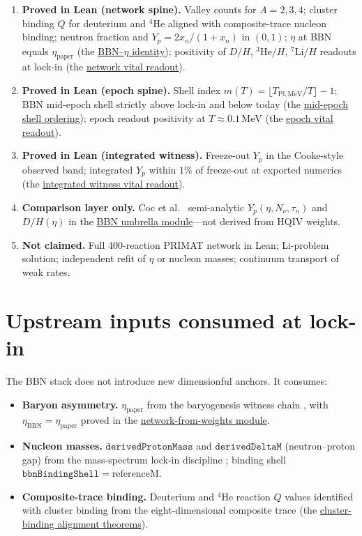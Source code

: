 \documentclass[11pt]{amsart}
\begin{document}
\begin{enumerate}[leftmargin=2em]
\item \textbf{Proved in Lean (network spine).}
  Valley counts for $A=2,3,4$; cluster binding $Q$ for deuterium and
  $^4\mathrm{He}$ aligned with composite-trace nucleon binding; neutron
  fraction and $Y_p=2x_n/(1+x_n)$ in $(0,1)$; $\eta$ at BBN equals
  $\eta_{\mathrm{paper}}$ (the \hyperref[lean:eta-bbn-eq]{BBN--$\eta$ identity});
  positivity of $D/H$, $^3\mathrm{He}/H$, $^7\mathrm{Li}/H$ readouts at
  lock-in (the \hyperref[lean:bbn-network-vital]{network vital readout}).
\item \textbf{Proved in Lean (epoch spine).}
  Shell index $m(T)=\lfloor T_{\mathrm{Pl,MeV}}/T\rfloor-1$; BBN mid-epoch
  shell strictly above lock-in and below today (the
  \hyperref[lean:bbn-mid-shell-order]{mid-epoch shell ordering});
  epoch readout positivity at $T\approx 0.1\,\mathrm{MeV}$ (the
  \hyperref[lean:bbn-epoch-vital]{epoch vital readout}).
\item \textbf{Proved in Lean (integrated witness).}
  Freeze-out $Y_p$ in the Cooke-style observed band; integrated $Y_p$
  within $1\%$ of freeze-out at exported numerics (the
  \hyperref[lean:bbn-integrated-vital]{integrated witness vital readout}).
\item \textbf{Comparison layer only.}
  Coc et al.\ \cite{coc2015} semi-analytic $Y_p(\eta,N_\nu,\tau_n)$ and
  $D/H(\eta)$ in the \hyperref[lean:bbn-umbrella]{BBN umbrella module}---not
  derived from HQIV weights.
\item \textbf{Not claimed.}
  Full 400-reaction PRIMAT network in Lean; Li-problem solution; independent
  refit of $\eta$ or nucleon masses; continuum transport of weak rates.
\end{enumerate}

\section{Upstream inputs consumed at lock-in}
\label{sec:inputs}

The BBN stack does not introduce new dimensionful anchors. It consumes:

\begin{itemize}[leftmargin=2em]
\item \textbf{Baryon asymmetry.}
  $\eta_{\mathrm{paper}}$ from the baryogenesis witness chain
  \cite{hqiv-baryogenesis-paper}, with
  $\eta_{\mathrm{BBN}}=\eta_{\mathrm{paper}}$ proved in the
  \hyperref[lean:bbn-network]{network-from-weights module}.
\item \textbf{Nucleon masses.}
  $\texttt{derivedProtonMass}$ and $\texttt{derivedDeltaM}$ (neutron--proton
  gap) from the mass-spectrum lock-in discipline
  \cite{hqiv-tuft-sm-lagrangian-paper,hqiv-kirchhoff-paper}; binding shell
  $\texttt{bbnBindingShell}=\mathrm{referenceM}$.
\item \textbf{Composite-trace binding.}
  Deuterium and $^4\mathrm{He}$ reaction $Q$ values identified with
  cluster binding from the eight-dimensional composite trace (the
  \hyperref[lean:bbn-cluster-binding]{cluster-binding alignment theorems}).
\end{itemize}
\end{document}
